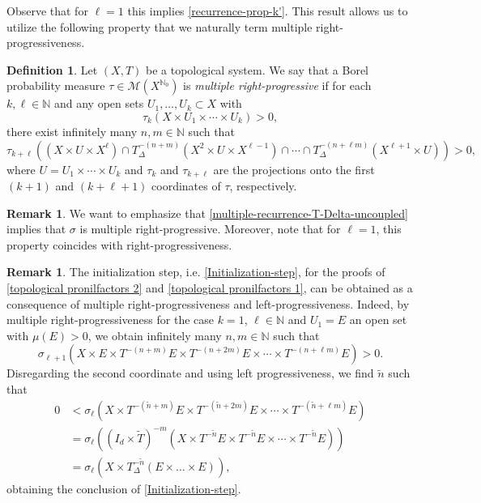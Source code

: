 \documentclass[letter, 11pt]{article}
\theoremstyle{definition}
\newtheorem{defn}[theo]{Definition}
\newtheorem{remark}[theo]{Remark}
\newtheorem*{remark*}{Remark}
\theoremstyle{plain}
\newcommand{\N}{\mathbb{N}}
\newcommand{\1}{\mathbbm{1}}
\begin{document}
Observe that for $\ell=1$ this implies \cref{recurrence-prop-k'}. This result 
allows us to utilize the following property that we naturally term multiple 
right-progressiveness.

\begin{defn} \label{def multiple right progressive}
    Let $(X,T)$ be a topological system. We say that a Borel probability measure $\tau\in \mathcal{M}(X^{\N_0})$ is \textit{multiple right-progressive} if for each $k,\ell \in \N$ and any open sets $U_1,\ldots,U_k\subset X$ with 
    $$\tau_k(X\times U_1\times \cdots \times U_k)>0, $$
    there exist infinitely many $n,m\in \N$ such that 
    $$\tau_{k+\ell}\left((X\times U \times X^{\ell})\cap T_\Delta^{-(n+m)}(X^2 \times U\times X^{\ell-1}) \cap \cdots \cap T_\Delta^{-(n+\ell m)}(X^{\ell+1}\times U)\right)>0,$$
    where $U=U_1\times \cdots \times U_k$ and $\tau_k$ and $\tau_{k+\ell}$ are the projections onto the first $(k+1)$ and $(k+\ell+1)$ coordinates of $\tau$, respectively.
\end{defn}
\begin{remark*}
We want to emphasize that \cref{multiple-recurrence-T-Delta-uncoupled} 
implies that $\sigma$ is multiple right-progressive. Moreover, note 
that for $\ell=1$, this property coincides with right-progressiveness. 
\end{remark*}
\begin{remark}\label{new proof of initialization-step}
    The initialization step, i.e. \cref{Initialization-step}, for the proofs of \cref{topological pronilfactors 2} and \cref{topological pronilfactors 1}, can be obtained as a consequence of multiple right-progressiveness and left-progressiveness. Indeed, by multiple right-progressiveness for the case $k=1$, $\ell \in \N$ and $U_1=E$ an open set with $\mu(E)>0$, we obtain infinitely many $n,m\in \N$ such that
    $$\sigma_{\ell +1}(X \times E\times T^{-(n+m)}E \times  T^{-(n+2m)}E \times \cdots \times  T^{-(n+\ell m)}E)>0.   $$
    Disregarding the second coordinate and using left progressiveness, we find $\tilde{n}$ such that
    \begin{align*}
        0&<\sigma_{\ell }(X \times T^{-(\tilde{n}+m)}E \times  T^{-(\tilde{n}+2m)}E \times \cdots \times  T^{-(\tilde{n}+\ell m)}E)\\
        &= \sigma_{\ell}((I_d\times \tilde{T})^{-m}(X \times T^{-\tilde{n}}E \times  T^{-\tilde{n}}E \times \cdots \times  T^{-\tilde{n}}E))\\
        &= \sigma_{\ell}(X\times T_\Delta^{-\tilde{n}} (E\times \dots \times E)),
    \end{align*}
    obtaining the conclusion of \cref{Initialization-step}. 
\end{remark}
\end{document}

